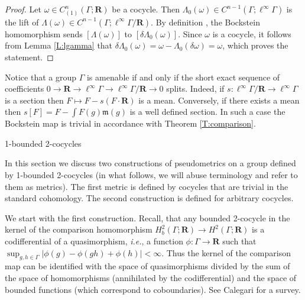 \documentclass[12pt,reqno,a4paper]{amsart}
\makeatletter
\def\section{\@startsection{section}{1}%
  \z@{.7\linespacing\@plus\linespacing}{.5\linespacing}%
  {\normalfont\bfseries\raggedright\boldmath}}
\theoremstyle{definition}
\theoremstyle{remark}
\numberwithin{equation}{section}
\numberwithin{figure}{section}
\newcommand{\B}[1]{{\mathbf #1}}
\newcommand{\F}[1]{{\mathfrak #1}}
\makeatother
\begin{document}
\begin{proof}
Let $\omega \in C^n_{(1)}(\Gamma;\B R)$ be a cocycle. 
Then $\Lambda_0(\omega)\in C^{n-1}(\Gamma;\ell^{\infty}\Gamma)$ is
the lift of $\Lambda(\omega)\in C^{n-1}(\Gamma;\ell^{\infty}\Gamma/\B R)$.
By definition \cite[Section 3.E]{zbMATH02103273}, the Bockstein homomorphism sends $[\Lambda(\omega)]$ to
$[\delta\Lambda_0(\omega)]$.  Since $\omega$ is a cocycle, it follows from
Lemma \ref{L:lgamma} that 
$\delta\Lambda_0(\omega) = \omega - \Lambda_0(\delta\omega) = \omega$,
which proves the statement.
\end{proof}

Notice that a group $\Gamma$ is amenable if and only if the short exact
sequence of coefficients $0\to\B R\to\ell^\infty\Gamma\to\ell^\infty\Gamma/\B R\to 0$ splits.
Indeed, if $s\colon \ell^{\infty}\Gamma/\B R \to \ell^{\infty}\Gamma$ is a section then
$F\mapsto F - s(F\cdot \B R)$ is a mean. Conversely, if there exists a mean then
$s[F] = F - \int F(g)\F m(g)$ is a well defined section.
In such a case the Bockstein map is trivial in accordance with Theorem \ref{T:comparison}.


\section{1-bounded 2-cocycles}\label{S:abstractly-lipschitz}

In this section we discuss two constructions of pseudometrics on a group
defined by 1-bounded 2-cocycles (in what follows, we will abuse terminology
and refer to them as metrics).  The first metric is defined by cocycles that
are trivial in the standard cohomology.  The second construction is defined for
arbitrary cocycles.

We start with the first construction.
Recall, that any bounded 2-cocycle in the kernel of the comparison homomorphism
$H^2_b(\Gamma;\B R)\to H^2(\Gamma;\B R)$ is a codifferential of a
quasimorphism, \textit{i.e.}, a function $\phi\colon\Gamma\to\B R$ such that
$\sup_{g,h\in\Gamma}|\phi(g)-\phi(gh)+\phi(h)|<\infty$.  
Thus the kernel of the comparison map can be identified with the space of 
quasimorphisms divided by the sum of the space of homomorphisms 
(annihilated by the codifferential) and the space of bounded functions
(which correspond to coboundaries). See Calegari \cite[Chapter 2]{zbMATH05577332} 
for a survey.
\end{document}
